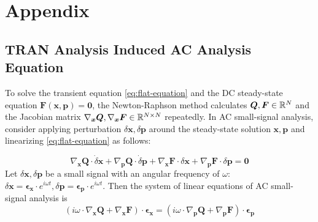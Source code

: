 \section*{Appendix}
\renewcommand\thesubsection{\Alph{subsection}}
\subsection{TRAN Analysis Induced AC Analysis Equation}\label{appendix:TRAN-to-AC-equation}
To solve the transient equation \ref{eq:flat-equation} and the DC steady-state equation $\bm{F}(\bm{x}, \bm{p})=\bm{0}$,
the Newton-Raphson method calculates $\bm{Q},\bm{F}\in\mathbb{R}^N$ and the Jacobian matrix $\nabla_{\bm{x}}\bm{Q},\nabla_{\bm{x}}\bm{F}\in\mathbb{R}^{N\times N}$ repeatedly.
In AC small-signal analysis, consider applying perturbation $\delta\bm{x},\delta\bm{p}$ around the steady-state solution $\bm{x},\bm{p}$ and linearizing \ref{eq:flat-equation} as follows:

\[
\nabla_{\bm{x}}\bm{Q}\cdot\dot{\delta}\bm{x}
+\nabla_{\bm{p}}\bm{Q}\cdot\dot{\delta}\bm{p}
+\nabla_{\bm{x}}\bm{F}\cdot\delta\bm{x}
+\nabla_{\bm{p}}\bm{F}\cdot\delta\bm{p}=\bm{0}
\]
Let $\delta\bm{x},\delta\bm{p}$ be a small signal with an angular frequency of $\omega$: 
$\delta\bm{x}=\bm{\epsilon}_{\bm{x}}\cdot e^{i\omega t},\delta\bm{p}=\bm{\epsilon}_{\bm{p}}\cdot e^{i\omega t}$.
Then the system of linear equations of AC small-signal analysis is
\begin{equation}\label{eq:flat-ac-equation}
(i\omega\cdot\nabla_{\bm{x}}\bm{Q}+\nabla_{\bm{x}}\bm{F})\cdot\bm{\epsilon}_{\bm{x}}
= (i\omega\cdot\nabla_{\bm{p}}\bm{Q}+\nabla_{\bm{p}}\bm{F})\cdot\bm{\epsilon}_{\bm{p}}
\end{equation}

